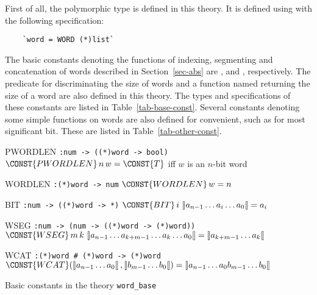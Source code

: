 First of all, the polymorphic type \word{*} is defined in this theory.
It is defined using  with the following
specification:
\begin{verbatim}
    `word = WORD (*)list`
\end{verbatim}
The basic constants denoting the functions of indexing, segmenting and
concatenation of words described in Section~\ref{sec-abs} are
,  and ,
respectively. The predicate  for discriminating the
size of words and a function named  returning the size
of a word are also defined in this theory. The types and specifications
of these constants are listed in Table~\ref{tab-base-const}. 
Several constants denoting some simple functions on words
are also defined for convenient, such as  for most significant
bit. These are listed in Table~\ref{tab-other-const}.
\begin{table}
\begin{center}
\begin{constants}
\item[PWORDLEN]\verb":num -> ((*)word -> bool)" \newline
        $\CONST{PWORDLEN} \,n \,w = \CONST{T}$ iff $w$ is an $n$-bit word 
\item[WORDLEN]\verb":(*)word -> num"\newline
        $\CONST{WORDLEN} \,w = n$ 
\item[BIT]\verb":num -> ((*)word -> *)"\newline
        $\CONST{BIT}\,i\, \nword{a_{n-1} \ldots a_i \ldots a_0} = a_i$ 
\item[WSEG]\verb":num -> (num -> ((*)word -> (*)word))" \newline
        $\CONST{WSEG}\,m\, k\,\nword{a_{n-1}\ldots a_{k+m-1}\ldots a_k\ldots a_0} = 
         \nword{a_{k + m -1} \ldots a_k} $ 
\item[WCAT]\verb":(*)word # (*)word -> (*)word" \newline
        $\CONST{WCAT}(\nword{a_{n-1}\ldots a_0}, \nword{b_{m-1}\ldots b_0}) =
         \nword{a_{n-1}\ldots a_0 b_{m-1}\ldots b_0} $
\end{constants}
\end{center}
\caption{Basic constants in the theory {\tt word\_base}\label{tab-base-const}}
\end{table}

